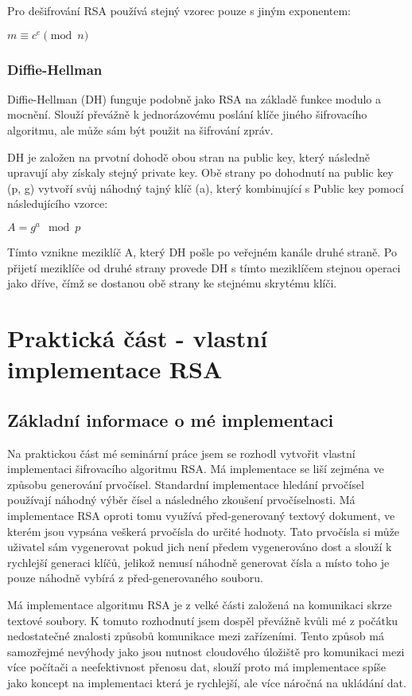 \documentclass[12pt,a4paper]{report}
\begin{document}
Pro dešifrování RSA používá stejný vzorec pouze s jiným exponentem:

$ m \equiv c^e \pmod n$

\subsection{Diffie-Hellman}
Diffie-Hellman (DH) funguje podobně jako RSA na základě funkce modulo a mocnění. Slouží převážně k jednorázovému poslání klíče jiného šifrovacího algoritmu, ale může sám být použit na šifrování zpráv.

DH je založen na prvotní dohodě obou stran na public key, který následně upravují aby získaly stejný private key. Obě strany po dohodnutí na public key (p, g) vytvoří svůj náhodný tajný klíč (a), který kombinující s Public key pomocí následujícího vzorce:

$ A = g^a \mod p$

Tímto vznikne meziklíč A, který DH pošle po veřejném kanále druhé straně. Po přijetí meziklíče od druhé strany provede DH s tímto meziklíčem stejnou operaci jako dříve, čímž se dostanou obě strany ke stejnému skrytému klíči.


\chapter{Praktická část - vlastní implementace RSA}

\section{Základní informace o mé implementaci}
Na praktickou část mé seminární práce jsem se rozhodl vytvořit vlastní implementaci šifrovacího algoritmu RSA. Má implementace se liší zejména ve způsobu generování prvočísel. Standardní implementace hledání prvočísel používají náhodný výběr čísel a následného zkoušení prvočíselnosti. Má implementace RSA oproti tomu využívá před-generovaný textový dokument, ve kterém jsou vypsána veškerá prvočísla do určité hodnoty. Tato prvočísla si může uživatel sám vygenerovat pokud jich není předem vygenerováno dost a slouží k rychlejší generaci klíčů, jelikož nemusí náhodně generovat čísla a místo toho je pouze náhodně vybírá z před-generovaného souboru. 

Má implementace algoritmu RSA je z velké části založená na komunikaci skrze textové soubory. K tomuto rozhodnutí jsem dospěl převážně kvůli mé z počátku nedostatečné znalosti způsobů komunikace mezi zařízeními. Tento způsob má samozřejmé nevýhody jako jsou nutnost cloudového úložiště pro komunikaci mezi více počítači a neefektivnost přenosu dat, slouží proto má implementace spíše jako koncept na implementaci která je rychlejší, ale více náročná na ukládání dat.
\end{document}
